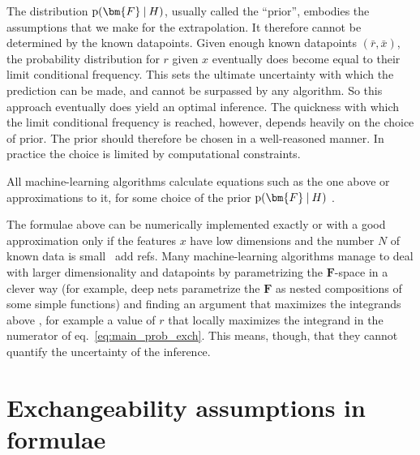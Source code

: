 \documentclass[\ifafour a4paper,12pt,\else a5paper,10pt,\fi%
onecolumn,oneside,article,%
british%
]{memoir}
\theoremstyle{remark}
\theoremstyle{innote}
\newcommand*{\p}{\mathrm{p}}%
\renewcommand*{\|}[1][]{\nonscript\:#1\vert\nonscript\:\mathopen{}}
\renewcommand*{\=}{\TextOrMath\texteq\eq}
\newcommand*{\eqn}{eq.}%
\newcommand*{\wrench}{{\fontencoding{U}\fontfamily{fontawesomethree}\selectfont\symbol{114}}}
\newcommand{\mynote}[1]{ {\color{notecolour}#1}}
\newcommand*{\ro}{r}
\newcommand*{\xo}{x}
\newcommand*{\rd}{\bar{r}}
\newcommand*{\xd}{\bar{x}}
\newcommand*{\yF}{\bm{F}}
\begin{document}
The distribution $\p(\yF \| H)$, usually called the \enquote{prior},
embodies the assumptions that we make for the extrapolation. It therefore
cannot be determined by the known datapoints. Given enough known datapoints
$(\rd,\xd)$, the probability distribution for $\ro$ given $\xo$
eventually does become equal to their limit conditional frequency. This
sets the ultimate uncertainty with which the prediction can be made, and
cannot be surpassed by any algorithm. So this approach eventually does
yield an optimal inference. The quickness with which the limit conditional
frequency is reached, however, depends heavily on the choice of prior. The
prior should therefore be chosen in a well-reasoned manner. In practice the
choice is limited by computational constraints.

All machine-learning algorithms calculate equations such as the one above
or approximations to it, for some choice of the prior $\p(\yF \| H)$
\parencites{mackay1992,bishop2006}.

The formulae above can be numerically implemented exactly or with a good
approximation only if the features $x$ have low dimensions and the number
$N$ of known data is small \mynote{\wrench\ add refs}. Many
machine-learning algorithms manage to deal with larger dimensionality and
datapoints by parametrizing the $\yF$-space in a clever way (for example,
deep nets parametrize the $\yF$ as nested compositions of some simple
functions) and finding an argument that maximizes the integrands above
\parencites{mackay1992,mackay1992b}, for example a value of $\ro$ that
locally maximizes the integrand in the numerator of
\eqn~\eqref{eq:main_prob_exch}. This means, though, that they cannot
quantify the uncertainty of the inference.

\section{Exchangeability assumptions in formulae}
\label{sec:exch_formulae}
\end{document}
